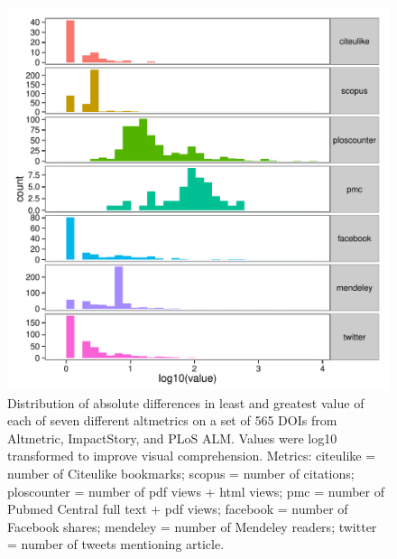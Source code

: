 \documentclass[letterpaper,superscriptaddress,showkeys,longbibliography]{revtex4-1}\usepackage{graphicx, color}
\newenvironment{knitrout}{}{} %
\begin{document}
\begin{knitrout}
\color{fgcolor}\begin{figure}[]


{\centering \includegraphics[width=.7\linewidth]{figure/dataconst_plot1} 

}

\caption[Distribution of absolute differences in least and greatest value of each of seven different altmetrics on a set of 565 DOIs from Altmetric, ImpactStory, and PLoS ALM]{Distribution of absolute differences in least and greatest value of each of seven different altmetrics on a set of 565 DOIs from Altmetric, ImpactStory, and PLoS ALM. Values were log10 transformed to improve visual comprehension. Metrics: citeulike = number of Citeulike bookmarks; scopus = number of citations; ploscounter = number of pdf views + html views; pmc = number of Pubmed Central full text + pdf views; facebook = number of Facebook shares; mendeley = number of Mendeley readers; twitter = number of tweets mentioning article.\label{fig:dataconst_plot1}}
\end{figure}


\end{knitrout}
\end{document}
